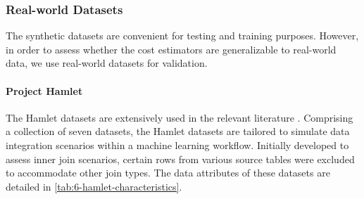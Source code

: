 \subsubsection{Real-world Datasets}
The synthetic datasets are convenient for testing and training purposes. However, in order to assess whether the cost estimators are generalizable to real-world data, we use real-world datasets for validation.

\paragraph{Project Hamlet \cite{2016-hamlet-sigmod}}
The Hamlet datasets are extensively used in the relevant literature \cite{2016-hamlet-sigmod, amalur, morpheus,orion_learning_gen_lin_models}. Comprising a collection of seven datasets, the Hamlet datasets are tailored to simulate data integration scenarios within a machine learning workflow. Initially developed to assess inner join scenarios, certain rows from various source tables were excluded to accommodate other join types. The data attributes of these datasets are detailed in \autoref{tab:6-hamlet-characteristics}.

